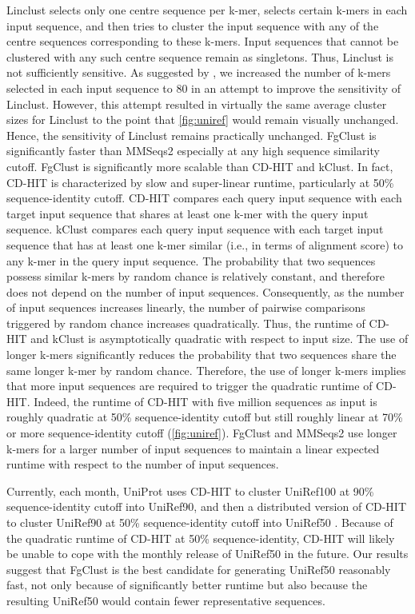 \documentclass[11pt,letterpaper]{llncs2e/llncs}
\begin{document}
Linclust 
	selects only one centre sequence per k-mer, 
	selects certain k-mers in each input sequence, 
	and then tries to cluster the input sequence with any of the centre sequences corresponding to these k-mers.
Input sequences that cannot be clustered with any such centre sequence remain as singletons.
Thus, Linclust is not sufficiently sensitive.
As suggested by \citet{steinegger2017linclust},
we increased the number of k-mers selected in each input sequence to 80 in an attempt to improve the sensitivity of Linclust.
However, this attempt resulted in virtually the same average cluster sizes for Linclust to the point that \cref{fig:uniref} would remain visually unchanged. Hence, the sensitivity of Linclust remains practically unchanged.
FgClust is significantly faster than MMSeqs2 especially at any high sequence similarity cutoff.
FgClust is significantly more scalable than CD-HIT and kClust. 
In fact, CD-HIT is characterized by slow and super-linear runtime, particularly at 50\% sequence-identity cutoff.
CD-HIT compares each query input sequence with each target input sequence that shares at least one k-mer with the query input sequence.
kClust compares each query input sequence with each target input sequence that has at least one k-mer similar (i.e., in terms of alignment score) to any k-mer in the query input sequence.
The probability that two sequences possess similar k-mers by random chance is relatively constant, and therefore does not depend on the number of input sequences.
Consequently, as the number of input sequences increases linearly, the number of pairwise comparisons triggered by random chance increases quadratically.
Thus, the runtime of CD-HIT and kClust is asymptotically quadratic with respect to input size.
The use of longer k-mers significantly reduces the probability that two sequences share the same longer k-mer by random chance.
Therefore, the use of longer k-mers implies that more input sequences are required to trigger the quadratic runtime of CD-HIT.
Indeed, the runtime of CD-HIT with five million sequences as input is roughly quadratic at 50\% sequence-identity cutoff but still roughly linear at 70\% or more sequence-identity cutoff (\cref{fig:uniref}).
FgClust and MMSeqs2 use longer k-mers for a larger number of input sequences to maintain a linear expected runtime with respect to the number of input sequences.

Currently, each month, UniProt uses CD-HIT to cluster UniRef100 at 90\% sequence-identity cutoff into UniRef90, and then a distributed version of CD-HIT to cluster UniRef90 at 50\% sequence-identity cutoff into UniRef50 \citep{suzek2014uniref}.
Because of the quadratic runtime of CD-HIT at 50\% sequence-identity, CD-HIT will likely be unable to cope with the monthly release of UniRef50 in the future.
Our results suggest that FgClust is the best candidate for generating UniRef50 reasonably fast, not only because of significantly better runtime but also because the resulting UniRef50 would contain fewer representative sequences.
\end{document}
